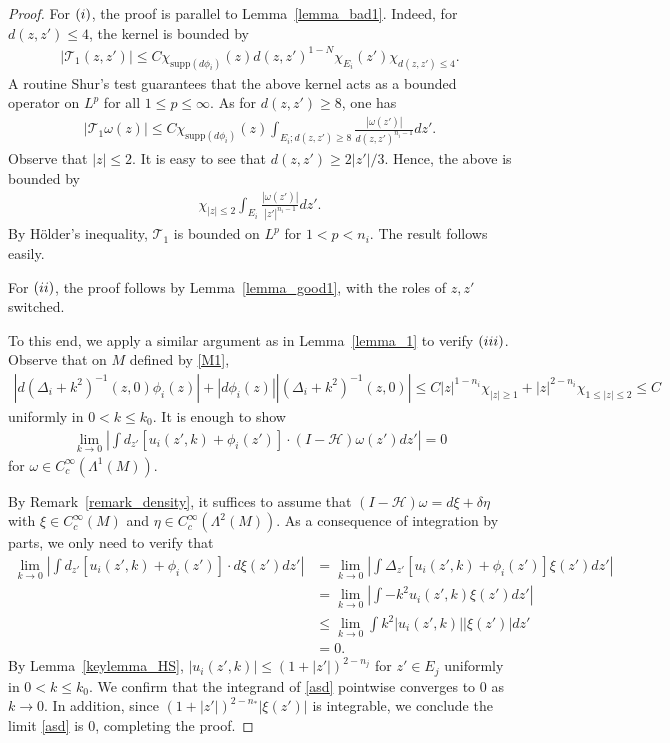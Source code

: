 \documentclass[12pt]{amsart}
\begin{document}
\begin{proof}
For $(\romannumeral1)$, the proof is parallel to Lemma~\ref{lemma_bad1}. Indeed, for $d(z,z')\le 4$, the kernel is bounded by
\begin{align*}
    |\mathcal{T}_1(z,z')| \le C \chi_{\textrm{supp}(d\phi_i)}(z) d(z,z')^{1-N} \chi_{E_i}(z') \chi_{d(z,z')\le 4}.
\end{align*}
A routine Shur's test guarantees that the above kernel acts as a bounded operator on $L^p$ for all $1\le p\le \infty$. As for $d(z,z')\ge 8$, one has
\begin{align*}
    |\mathcal{T}_1\omega(z)| \le C \chi_{\textrm{supp}(d\phi_i)}(z) \int_{E_i; d(z,z')\ge 8} \frac{|\omega(z')|}{d(z,z')^{n_i-1}} dz'.
\end{align*}
Observe that $|z|\le 2$. It is easy to see that $d(z,z')\ge 2|z'|/3$. Hence, the above is bounded by
\begin{align*}
    \chi_{|z|\le 2} \int_{E_i} \frac{|\omega(z')|}{|z'|^{n_i-1}} dz'.
\end{align*}
By Hölder's inequality, $\mathcal{T}_1$ is bounded on $L^p$ for $1<p<n_i$. The result follows easily.

For $(\romannumeral2)$, the proof follows by Lemma~\ref{lemma_good1}, with the roles of $z,z'$ switched.

To this end, we apply a similar argument as in Lemma~\ref{lemma_1} to verify $(\romannumeral3)$. Observe that on $M$ defined by \eqref{M1}, 
\begin{align*}
    |d(\Delta_i+k^2)^{-1}(z,0) \phi_i(z)| + |d\phi_i(z)||(\Delta_i+k^2)^{-1}(z,0)| \le C |z|^{1-n_i} \chi_{|z|\ge 1} + |z|^{2-n_i} \chi_{1\le |z|\le 2} \le C
\end{align*}
uniformly in $0<k\le k_0$. It is enough to show 
\begin{align}
    \lim_{k\to 0} \left| \int d_{z'}\left[u_i(z',k) +  \phi_i(z')\right] \cdot (I-\mathcal{H})\omega(z') dz'  \right| = 0
\end{align}
for $\omega \in C_c^\infty(\Lambda^1(M))$.

By Remark~\ref{remark_density}, it suffices to assume that $(I-\mathcal{H})\omega = d\xi + \delta \eta$ with $\xi \in C_c^\infty(M)$ and $\eta \in C_c^\infty(\Lambda^2(M))$. As a consequence of integration by parts, we only need to verify that 
\begin{align}\label{asd}
    \lim_{k\to 0} \left| \int d_{z'}\left[u_i(z',k) +  \phi_i(z')\right] \cdot d\xi(z') dz'  \right| &= \lim_{k\to 0} \left| \int \Delta_{z'}\left[u_i(z',k) +  \phi_i(z')\right]  \xi(z') dz'  \right|\\ \nonumber
    &= \lim_{k\to 0} \left| \int -k^2 u_i(z',k) \xi(z') dz' \right|\\ \nonumber
    &\le \lim_{k\to 0} \int k^2 |u_i(z',k)| |\xi(z')| dz'\\ \nonumber
    &=0.
\end{align}
By Lemma~\ref{keylemma_HS}, $|u_i(z',k)|\le (1+|z'|)^{2-n_j}$ for $z'\in E_j$ uniformly in $0<k\le k_0$. We confirm that the integrand of \eqref{asd} pointwise converges to 0 as $k \to 0$. In addition, since $(1+|z'|)^{2-n_*}|\xi(z')|$ is integrable, we conclude the limit \eqref{asd} is 0, completing the proof.





\end{proof}
\end{document}
